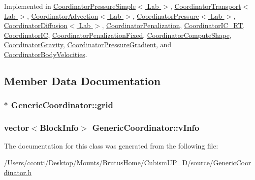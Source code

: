 Implemented in \hyperlink{class_coordinator_pressure_simple_ac88aa207fcb800383086650a58de624a}{Coordinator\+Pressure\+Simple$<$ Lab $>$}, \hyperlink{class_coordinator_transport_a1dccecd0a18cdd8de9dde922152df33a}{Coordinator\+Transport$<$ Lab $>$}, \hyperlink{class_coordinator_advection_a9cb32410e2cbfcf419138060be504fbb}{Coordinator\+Advection$<$ Lab $>$}, \hyperlink{class_coordinator_pressure_a49fa217bd91b1e8712861745c066ba53}{Coordinator\+Pressure$<$ Lab $>$}, \hyperlink{class_coordinator_diffusion_a110e64039f79bcc6f0bfd430cb1f8c53}{Coordinator\+Diffusion$<$ Lab $>$}, \hyperlink{class_coordinator_penalization_ac6138327b1de95c0cf53d0ed47872292}{Coordinator\+Penalization}, \hyperlink{class_coordinator_i_c___r_t_a4a8653482a770c346ff8939a2f92a4af}{Coordinator\+I\+C\+\_\+\+R\+T}, \hyperlink{class_coordinator_i_c_a75f8e04638d34d0a726f0e1b0939be1e}{Coordinator\+I\+C}, \hyperlink{class_coordinator_penalization_fixed_adb344c7e7ded7b7e8f4d948c38d0c980}{Coordinator\+Penalization\+Fixed}, \hyperlink{class_coordinator_compute_shape_a3c3eb6c738617c70ba72a74fe8a10038}{Coordinator\+Compute\+Shape}, \hyperlink{class_coordinator_gravity_aa9066a9ec827fc22e02aa350c54b1198}{Coordinator\+Gravity}, \hyperlink{class_coordinator_pressure_gradient_a1590a45c86e3a5ba33e10eb793d553f3}{Coordinator\+Pressure\+Gradient}, and \hyperlink{class_coordinator_body_velocities_a0026fe01ababb24ef5918bca94421043}{Coordinator\+Body\+Velocities}.



\subsection{Member Data Documentation}
\hypertarget{class_generic_coordinator_aa514bbf7394bb5519c6f12daa33a375a}{}
\subsubsection[{grid}]{$\ast$ Generic\+Coordinator\+::grid\hspace{0.3cm}{\ttfamily [protected]}}\label{class_generic_coordinator_aa514bbf7394bb5519c6f12daa33a375a}
\hypertarget{class_generic_coordinator_a48c2df68fe1011811521210699122867}{}
\subsubsection[{v\+Info}]{\setlength{\rightskip}{0pt plus 5cm}vector$<${\bf Block\+Info}$>$ Generic\+Coordinator\+::v\+Info\hspace{0.3cm}{\ttfamily [protected]}}\label{class_generic_coordinator_a48c2df68fe1011811521210699122867}


The documentation for this class was generated from the following file\+:\begin{DoxyCompactItemize}
\item 
/\+Users/cconti/\+Desktop/\+Mounts/\+Brutus\+Home/\+Cubism\+U\+P\+\_\+D/source/\hyperlink{_generic_coordinator_8h}{Generic\+Coordinator.\+h}\end{DoxyCompactItemize}
